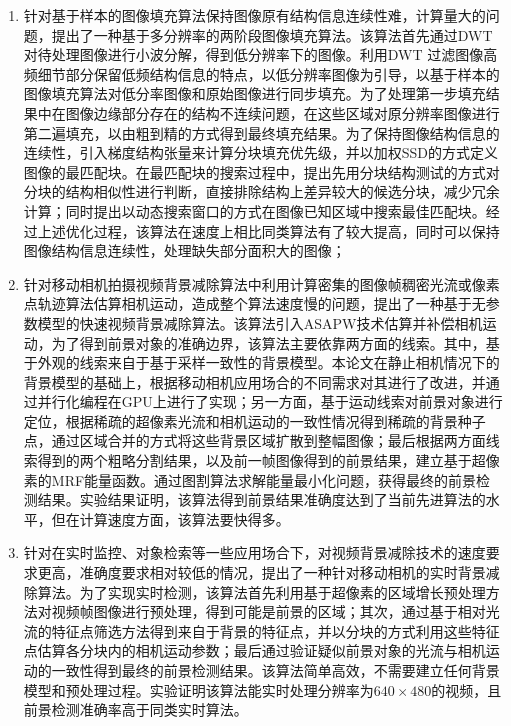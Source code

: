 \begin{enumerate}
  \item 针对基于样本的图像填充算法保持图像原有结构信息连续性难，计算量大的问题，提出了一种基于多分辨率的两阶段图像填充算法。该算法首先通过DWT对待处理图像进行小波分解，得到低分辨率下的图像。利用DWT 过滤图像高频细节部分保留低频结构信息的特点，以低分辨率图像为引导，以基于样本的图像填充算法对低分率图像和原始图像进行同步填充。为了处理第一步填充结果中在图像边缘部分存在的结构不连续问题，在这些区域对原分辨率图像进行第二遍填充，以由粗到精的方式得到最终填充结果。为了保持图像结构信息的连续性，引入梯度结构张量来计算分块填充优先级，并以加权SSD的方式定义图像的最匹配块。在最匹配块的搜索过程中，提出先用分块结构测试的方式对分块的结构相似性进行判断，直接排除结构上差异较大的候选分块，减少冗余计算；同时提出以动态搜索窗口的方式在图像已知区域中搜索最佳匹配块。经过上述优化过程，该算法在速度上相比同类算法有了较大提高，同时可以保持图像结构信息连续性，处理缺失部分面积大的图像；
  \item 针对移动相机拍摄视频背景减除算法中利用计算密集的图像帧稠密光流或像素点轨迹算法估算相机运动，造成整个算法速度慢的问题，提出了一种基于无参数模型的快速视频背景减除算法。该算法引入ASAPW技术估算并补偿相机运动，为了得到前景对象的准确边界，该算法主要依靠两方面的线索。其中，基于外观的线索来自于基于采样一致性的背景模型。本论文在静止相机情况下的背景模型的基础上，根据移动相机应用场合的不同需求对其进行了改进，并通过并行化编程在GPU上进行了实现；另一方面，基于运动线索对前景对象进行定位，根据稀疏的超像素光流和相机运动的一致性情况得到稀疏的背景种子点，通过区域合并的方式将这些背景区域扩散到整幅图像；最后根据两方面线索得到的两个粗略分割结果，以及前一帧图像得到的前景结果，建立基于超像素的MRF能量函数。通过图割算法求解能量最小化问题，获得最终的前景检测结果。实验结果证明，该算法得到前景结果准确度达到了当前先进算法的水平，但在计算速度方面，该算法要快得多。
  \item 针对在实时监控、对象检索等一些应用场合下，对视频背景减除技术的速度要求更高，准确度要求相对较低的情况，提出了一种针对移动相机的实时背景减除算法。为了实现实时检测，该算法首先利用基于超像素的区域增长预处理方法对视频帧图像进行预处理，得到可能是前景的区域；其次，通过基于相对光流的特征点筛选方法得到来自于背景的特征点，并以分块的方式利用这些特征点估算各分块内的相机运动参数；最后通过验证疑似前景对象的光流与相机运动的一致性得到最终的前景检测结果。该算法简单高效，不需要建立任何背景模型和预处理过程。实验证明该算法能实时处理分辨率为$640 \times 480$的视频，且前景检测准确率高于同类实时算法。
\end{enumerate}

